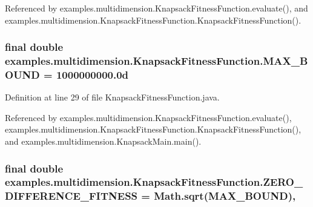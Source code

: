 Referenced by examples.\-multidimension.\-Knapsack\-Fitness\-Function.\-evaluate(), and examples.\-multidimension.\-Knapsack\-Fitness\-Function.\-Knapsack\-Fitness\-Function().

\hypertarget{classexamples_1_1multidimension_1_1_knapsack_fitness_function_ac0c7b5ff45d180a1cebbf7c78391d5ac}{
\subsubsection[{M\-A\-X\-\_\-\-B\-O\-U\-N\-D}]{\setlength{\rightskip}{0pt plus 5cm}final double examples.\-multidimension.\-Knapsack\-Fitness\-Function.\-M\-A\-X\-\_\-\-B\-O\-U\-N\-D = 1000000000.\-0d\hspace{0.3cm}{\ttfamily [static]}}}\label{classexamples_1_1multidimension_1_1_knapsack_fitness_function_ac0c7b5ff45d180a1cebbf7c78391d5ac}


Definition at line 29 of file Knapsack\-Fitness\-Function.\-java.



Referenced by examples.\-multidimension.\-Knapsack\-Fitness\-Function.\-evaluate(), examples.\-multidimension.\-Knapsack\-Fitness\-Function.\-Knapsack\-Fitness\-Function(), and examples.\-multidimension.\-Knapsack\-Main.\-main().

\hypertarget{classexamples_1_1multidimension_1_1_knapsack_fitness_function_a3a515d570549147e7a463145811d368b}{
\subsubsection[{Z\-E\-R\-O\-\_\-\-D\-I\-F\-F\-E\-R\-E\-N\-C\-E\-\_\-\-F\-I\-T\-N\-E\-S\-S}]{\setlength{\rightskip}{0pt plus 5cm}final double examples.\-multidimension.\-Knapsack\-Fitness\-Function.\-Z\-E\-R\-O\-\_\-\-D\-I\-F\-F\-E\-R\-E\-N\-C\-E\-\_\-\-F\-I\-T\-N\-E\-S\-S = Math.\-sqrt({\bf M\-A\-X\-\_\-\-B\-O\-U\-N\-D})\hspace{0.3cm}{\ttfamily [static]}, {\ttfamily [private]}}}\label{classexamples_1_1multidimension_1_1_knapsack_fitness_function_a3a515d570549147e7a463145811d368b}



